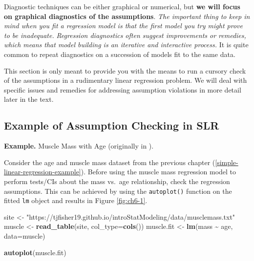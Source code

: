 \documentclass[
]{book}
\newenvironment{Shaded}{\begin{snugshade}}{\end{snugshade}}
\newcommand{\AttributeTok}[1]{\textcolor[rgb]{0.13,0.29,0.53}{#1}}
\newcommand{\FunctionTok}[1]{\textcolor[rgb]{0.13,0.29,0.53}{\textbf{#1}}}
\newcommand{\NormalTok}[1]{#1}
\newcommand{\OtherTok}[1]{\textcolor[rgb]{0.56,0.35,0.01}{#1}}
\newcommand{\SpecialCharTok}[1]{\textcolor[rgb]{0.81,0.36,0.00}{\textbf{#1}}}
\newcommand{\StringTok}[1]{\textcolor[rgb]{0.31,0.60,0.02}{#1}}
\begin{document}
Diagnostic techniques can be either graphical or numerical, but \textbf{we will focus on graphical diagnostics of the assumptions}.
\emph{The important thing to keep in mind when you fit a regression model is that the first model you try might prove to be inadequate.}
\emph{Regression diagnostics often suggest improvements or remedies, which means that model building is an iterative and interactive process.}
It is quite common to repeat diagnostics on a succession of models fit to the same data.

This section is only meant to provide you with the means to run a cursory check of the assumptions in a rudimentary linear regression problem.
We will deal with specific issues and remedies for addressing assumption violations in more detail later in the text.

\hypertarget{example-of-assumption-checking-in-slr}{%
\subsection{Example of Assumption Checking in SLR}\label{example-of-assumption-checking-in-slr}}

\textbf{Example.} Muscle Mass with Age (originally in \citet{KutnerText}).

Consider the age and muscle mass dataset from the previous chapter (\ref{simple-linear-regression-example}).
Before using the muscle mass regression model to perform tests/CIs about the mass vs.~age relationship, check the regression assumptions. This can be achieved by using the \texttt{autoplot()} function on the fitted \texttt{lm} object and results in Figure \ref{fig:ch6-1}.

\begin{Shaded}
\begin{Highlighting}[]
\NormalTok{site }\OtherTok{\textless{}{-}} \StringTok{"https://tjfisher19.github.io/introStatModeling/data/musclemass.txt"}
\NormalTok{muscle }\OtherTok{\textless{}{-}} \FunctionTok{read\_table}\NormalTok{(site, }\AttributeTok{col\_type=}\FunctionTok{cols}\NormalTok{())}
\NormalTok{muscle.fit }\OtherTok{\textless{}{-}} \FunctionTok{lm}\NormalTok{(mass }\SpecialCharTok{\textasciitilde{}}\NormalTok{ age, }\AttributeTok{data=}\NormalTok{muscle)}
\end{Highlighting}
\end{Shaded}

\begin{Shaded}
\begin{Highlighting}[]
\FunctionTok{autoplot}\NormalTok{(muscle.fit)}
\end{Highlighting}
\end{Shaded}
\end{document}
